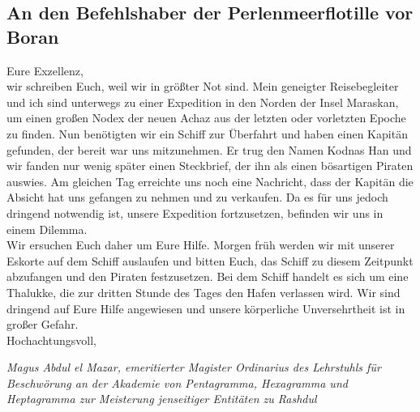 \documentclass[final]{multiversum}
\begin{document}
\subsection{An den Befehlshaber der Perlenmeerflotille vor Boran}
Eure Exzellenz,\\[1em]
wir schreiben Euch, weil wir in größter Not sind.
Mein geneigter Reisebegleiter und ich sind unterwegs zu einer Expedition in den Norden der Insel Maraskan, um einen großen Nodex der neuen Achaz aus der letzten oder vorletzten Epoche zu finden.
Nun benötigten wir ein Schiff zur Überfahrt und haben einen Kapitän gefunden, der bereit war uns mitzunehmen.
Er trug den Namen Kodnas Han und wir fanden nur wenig später einen Steckbrief, der ihn als einen bösartigen Piraten auswies.
Am gleichen Tag erreichte uns noch eine Nachricht, dass der Kapitän die Absicht hat uns gefangen zu nehmen und zu verkaufen.
Da es für uns jedoch dringend notwendig ist, unsere Expedition fortzusetzen, befinden wir uns in einem Dilemma.\\
Wir ersuchen Euch daher um Eure Hilfe.
Morgen früh werden wir mit unserer Eskorte auf dem Schiff auslaufen und bitten Euch, das Schiff zu diesem Zeitpunkt abzufangen und den Piraten festzusetzen.
Bei dem Schiff handelt es sich um eine Thalukke, die zur dritten Stunde des Tages den Hafen verlassen wird.
Wir sind dringend auf Eure Hilfe angewiesen und unsere körperliche Unversehrtheit ist in großer Gefahr.\\[1em]
Hochachtungsvoll,
\begin{flushright}
    \textit{Magus Abdul el Mazar, emeritierter Magister Ordinarius des Lehrstuhls für Beschwörung an der Akademie von Pentagramma, Hexagramma und Heptagramma zur Meisterung jenseitiger Entitäten zu Rashdul}
\end{flushright}



\end{document}
